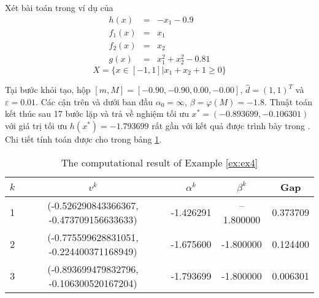 \begin{vd} Xét bài toán trong ví dụ của \cite{example4} \label{ex:ex4}
    \[
\begin{array}{ccl}
h(x) & = & -x_{1} - 0.9\\
f_{1}(x) & = & x_1\\
f_{2}(x) & = & x_2\\
g(x) &=& x_1^2 + x_2^2 - 0.81
\end{array}
\]
\[
X = \{x \in [-1, 1] \vert x_1 + x_2 + 1 \geq 0 \}
\]
\end{vd}
Tại bước khỏi tạo, hộp $[m,M] =[-0.90,-0.90,0.00,-0.00]$, $\hat{d}=(1, 1)^{T}$ và $\varepsilon=0.01$.
Các cận trên và dưới ban đầu $\alpha_{0}=\infty$, $\beta=\varphi(M)=-1.8$.
Thuật toán kết thúc sau 17 bước lặp và trả về nghiệm tối ưu $x^{*}=(-0.893699, -0.106301)$ với giá trị tối ưu $h(x^{*})=-1.793699$ rất gần với kết quả được trình bày trong \cite{example4}. Chi tiết tính toán được cho trong bảng \ref{tab:ex4}.
\begin{table}[h]
\centering{}\caption{\label{tab:ex4}The computational result of Example \ref{ex:ex4}}
\begin{centering}
\begin{tabular}{ccccc}
\hline 
$k$ & $v^{k}$ & $\alpha^{k}$ & $\beta^{k}$ & Gap\tabularnewline
\hline 
\hline 
1 & (-0.526290843366367, -0.473709156633633) & -1.426291 & --1.800000 & 0.373709\tabularnewline
\hline 
2 & (-0.775599628831051, -0.224400371168949) & -1.675600 & -1.800000 & 0.124400\tabularnewline
\hline 
3 & (-0.893699479832796, -0.106300520167204) & -1.793699 & -1.800000 & 0.006301\tabularnewline
\hline 
\end{tabular}
\par\end{centering}
\end{table}


